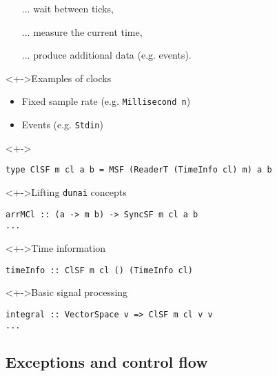 \documentclass{enigtex-beamer-base}
\begin{document}
\begin{frame}[fragile]
\begin{itemize}
	\item[...] wait between ticks,
	\item[...] measure the current time,
	\item[...] produce additional data (e.g. events).
\end{itemize}

\begin{block}<+->{Examples of clocks}
\begin{itemize}
	\item Fixed sample rate (e.g. \texttt{Millisecond n})
	\item Events (e.g. \texttt{Stdin})
\end{itemize}
\end{block}
\end{frame}


\begin{frame}[fragile]
\begin{block}<+->{}
\begin{verbatim}
type ClSF m cl a b = MSF (ReaderT (TimeInfo cl) m) a b
\end{verbatim}
\end{block}
\begin{block}<+->{Lifting \texttt{dunai} concepts}
\begin{verbatim}
arrMCl :: (a -> m b) -> SyncSF m cl a b
...
\end{verbatim}
\end{block}
\begin{block}<+->{Time information}
\begin{verbatim}
timeInfo :: ClSF m cl () (TimeInfo cl)
\end{verbatim}
\end{block}
\begin{block}<+->{Basic signal processing}
\begin{verbatim}
integral :: VectorSpace v => ClSF m cl v v
...
\end{verbatim}
\end{block}
\end{frame}

\subsection{Exceptions and control flow}
\end{document}
